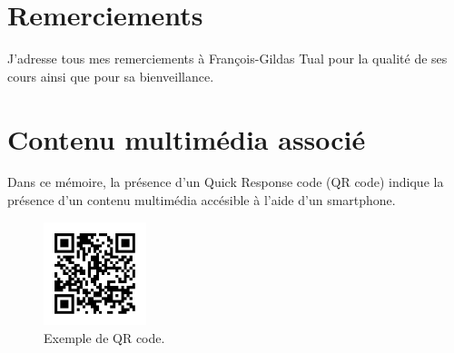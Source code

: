 
\section*{Remerciements}

J'adresse tous mes remerciements à François-Gildas Tual pour la qualité de ses
cours ainsi que pour sa bienveillance.


\section*{Contenu multimédia associé}

Dans ce mémoire, la présence d'un Quick Response code (QR code) indique la
présence d'un contenu multimédia accésible à l'aide d'un smartphone.

\begin{figure}[!ht]
  \begin{bigcenter}
    \includegraphics[width=3cm, keepaspectratio]{qr-cover.pdf}
  \end{bigcenter}
  \caption{Exemple de QR code.}
\end{figure}

